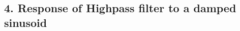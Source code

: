 \documentclass[11pt]{article}
\begin{document}
    \begin{center}
    \end{center}
    { \hspace*{\fill} \\}
    
    \begin{center}
    \end{center}
    { \hspace*{\fill} \\}
    
    \hypertarget{response-of-highpass-filter-to-a-damped-sinusoid}{%
\subsection{4. Response of Highpass filter to a damped
sinusoid}\label{response-of-highpass-filter-to-a-damped-sinusoid}}
\end{document}
